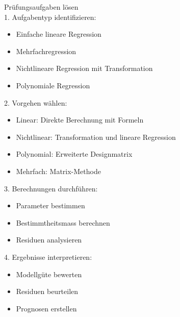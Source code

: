 \begin{KR}{Prüfungsaufgaben lösen}\\
1. Aufgabentyp identifizieren:
   \begin{itemize}
     \item Einfache lineare Regression
     \item Mehrfachregression
     \item Nichtlineare Regression mit Transformation
     \item Polynomiale Regression
   \end{itemize}

2. Vorgehen wählen:
   \begin{itemize}
     \item Linear: Direkte Berechnung mit Formeln
     \item Nichtlinear: Transformation und lineare Regression
     \item Polynomial: Erweiterte Designmatrix
     \item Mehrfach: Matrix-Methode
   \end{itemize}

3. Berechnungen durchführen:
   \begin{itemize}
     \item Parameter bestimmen
     \item Bestimmtheitsmass berechnen
     \item Residuen analysieren
   \end{itemize}

4. Ergebnisse interpretieren:
   \begin{itemize}
     \item Modellgüte bewerten
     \item Residuen beurteilen
     \item Prognosen erstellen
   \end{itemize}
\end{KR}

